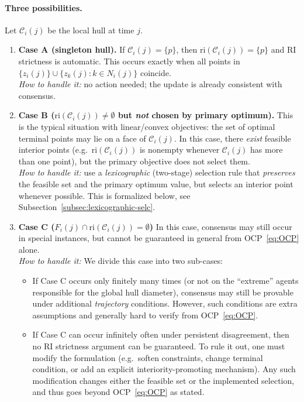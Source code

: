 \documentclass[12pt,draftcls,onecolumn]{IEEEtran}
\def\C{\mathcal{C}}
\def\Cij{\mathcal{C}_i (j)}
\def\ri{\mathrm{ri}}
\begin{document}
\paragraph{Three possibilities.}
Let $\C_i(j)$ be the local hull at time $j$.
\begin{enumerate}
\item \textbf{Case A (singleton hull).} If $\Cij=\{p\}$, then $\ri(\Cij)=\{p\}$ and RI
strictness is automatic.
This occurs exactly when all points in
$\{z_i(j)\}\cup\{z_k(j):k\in N_i(j)\}$ coincide.\\
\emph{How to handle it:} no action needed; the update is already consistent with consensus.
\item \textbf{Case B ($\ri(\Cij)\neq\emptyset$ but \emph{not} chosen by primary optimum).} 
This is the typical situation with linear/convex objectives: the set of optimal terminal points
may lie on a face of $\Cij$. In this case, there \emph{exist} feasible interior points
(e.g.\ $\ri(\Cij)$ is nonempty whenever $\Cij$ has more than one point), but the primary objective
does not select them.\\
\emph{How to handle it:} use a \emph{lexicographic} (two-stage) selection rule that \emph{preserves} the feasible set and the primary optimum value, but selects an interior point
whenever possible. 
This is formalized below, see Subsection~\ref{subsec:lexicographic-selc}.
\item \textbf{Case C ($F_i(j)\cap \ri(\Cij)=\emptyset$)} 
In this case, consensus may still occur in special instances, but cannot be guaranteed in general from OCP~\eqref{eq:OCP} alone.\\
\emph{How to handle it:}
We divide this case into two sub-cases:
\begin{itemize}
\item If Case C occurs only finitely many times (or not on the ``extreme'' agents responsible for the
global hull diameter), consensus may still be provable under additional \emph{trajectory} conditions.
However, such conditions are extra assumptions and generally hard to verify from OCP~\eqref{eq:OCP}.
\item If Case C can occur infinitely often under persistent disagreement, then no RI strictness
argument can be guaranteed.
To rule it out, one must modify the formulation (e.g.\ soften constraints, change
terminal condition, or add an explicit interiority-promoting mechanism).
Any such modification changes either the feasible set or the implemented selection, and thus goes beyond OCP~\eqref{eq:OCP} as stated.
\end{itemize} 
\end{enumerate}
\end{document}

